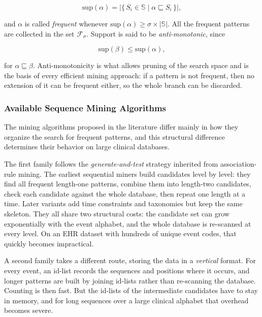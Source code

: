 \begin{equation}
    \mathrm{sup}(\alpha) = \bigl|\{\, S_i \in \mathbb{S} \mid \alpha \sqsubseteq S_i \,\}\bigr|,
    \label{eq:support}
\end{equation}

and $\alpha$ is called \emph{frequent} whenever $\mathrm{sup}(\alpha) \geq \sigma \times |\mathbb{S}|$. All the frequent patterns are collected in the set $\mathcal{F}_\sigma$. Support is said to be \emph{anti-monotonic}, since

\begin{equation}
    \mathrm{sup}(\beta) \leq \mathrm{sup}(\alpha),
    \label{eq:antimonotone}
\end{equation}

for $\alpha \sqsubseteq \beta$. Anti-monotonicity is what allows pruning of the search space and is the basis of every efficient mining approach: if a pattern is not frequent, then no extension of it can be frequent either, so the whole branch can be discarded.

\subsubsection*{Available Sequence Mining Algorithms}

The mining algorithms proposed in the literature differ mainly in how they organize the search for frequent patterns, and this structural difference determines their behavior on large clinical databases.

The first family follows the \emph{generate-and-test} strategy inherited from association-rule mining. The earliest sequential miners build candidates level by level: they find all frequent length-one patterns, combine them into length-two candidates, check each candidate against the whole database, then repeat one length at a time. Later variants add time constraints and taxonomies but keep the same skeleton. They all share two structural costs: the candidate set can grow exponentially with the event alphabet, and the whole database is re-scanned at every level. On an EHR dataset with hundreds of unique event codes, that quickly becomes impractical.

A second family takes a different route, storing the data in a \emph{vertical} format. For every event, an id-list records the sequences and positions where it occurs, and longer patterns are built by joining id-lists rather than re-scanning the database. Counting is then fast. But the id-lists of the intermediate candidates have to stay in memory, and for long sequences over a large clinical alphabet that overhead becomes severe.

